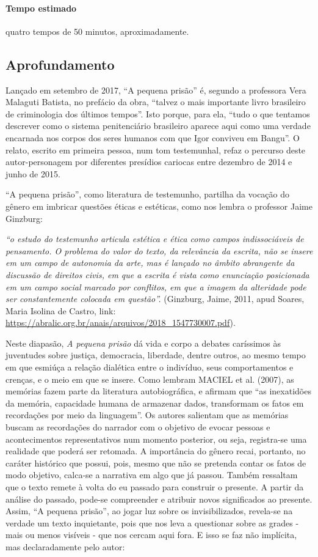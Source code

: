 \documentclass[11pt]{extarticle}
\begin{document}
\paragraph{Tempo estimado} quatro tempos de 50 minutos, aproximadamente.

\subsection{Aprofundamento}

Lançado em setembro de 2017, ``A pequena prisão'' é, segundo a
professora Vera Malaguti Batista, no prefácio da obra, ``talvez o mais
importante livro brasileiro de criminologia dos últimos tempos''. Isto
porque, para ela, ``tudo o que tentamos descrever como o sistema
penitenciário brasileiro aparece aqui como uma verdade encarnada nos
corpos dos seres humanos com que Igor conviveu em Bangu''. O relato,
escrito em primeira pessoa, num tom testemunhal, refaz o percurso deste
autor-personagem por diferentes presídios cariocas entre dezembro de
2014 e junho de 2015.

``A pequena prisão'', como literatura de testemunho, partilha da vocação
do gênero em imbricar questões éticas e estéticas, como nos lembra o
professor Jaime Ginzburg:

\emph{``o estudo do testemunho articula estética e ética como campos
indissociáveis de pensamento. O problema do valor do texto, da
relevância da escrita, não se insere em um campo de autonomia da arte,
mas é lançado no âmbito abrangente da discussão de direitos civis, em
que a escrita é vista como enunciação posicionada em um campo social
marcado por conflitos, em que a imagem da alteridade pode ser
constantemente colocada em questão''.} (Ginzburg, Jaime, 2011, apud
Soares, Maria Isolina de Castro, link:
\href{abralic.org.br}{{https://abralic.org.br/anais/arquivos/2018\_1547730007.pdf}}).

Neste diapasão, \emph{A pequena prisão} dá vida e corpo a debates
caríssimos às juventudes sobre justiça, democracia, liberdade, dentre
outros, ao mesmo tempo em que esmiúça a relação dialética entre o
indivíduo, seus comportamentos e crenças, e o meio em que se insere.
Como lembram MACIEL et al. (2007), as memórias fazem parte da literatura
autobiográfica, e afirmam que ``as inexatidões da memória, capacidade
humana de armazenar dados, transformam os fatos em recordações por meio
da linguagem''. Os autores salientam que as memórias buscam as
recordações do narrador com o objetivo de evocar pessoas e
acontecimentos representativos num momento posterior, ou seja,
registra-se uma realidade que poderá ser retomada. A importância do
gênero recai, portanto, no caráter histórico que possui, pois, mesmo que
não se pretenda contar os fatos de modo objetivo, calca-se a narrativa
em algo que já passou. Também ressaltam que o texto remete à volta do eu
passado para construir o presente. A partir da análise do passado,
pode-se compreender e atribuir novos significados ao presente. Assim,
``A pequena prisão'', ao jogar luz sobre os invisibilizados, revela-se
na verdade um texto inquietante, pois que nos leva a questionar sobre as
grades - mais ou menos visíveis - que nos cercam aqui fora. E isso se
faz não implícita, mas declaradamente pelo autor:
\end{document}
